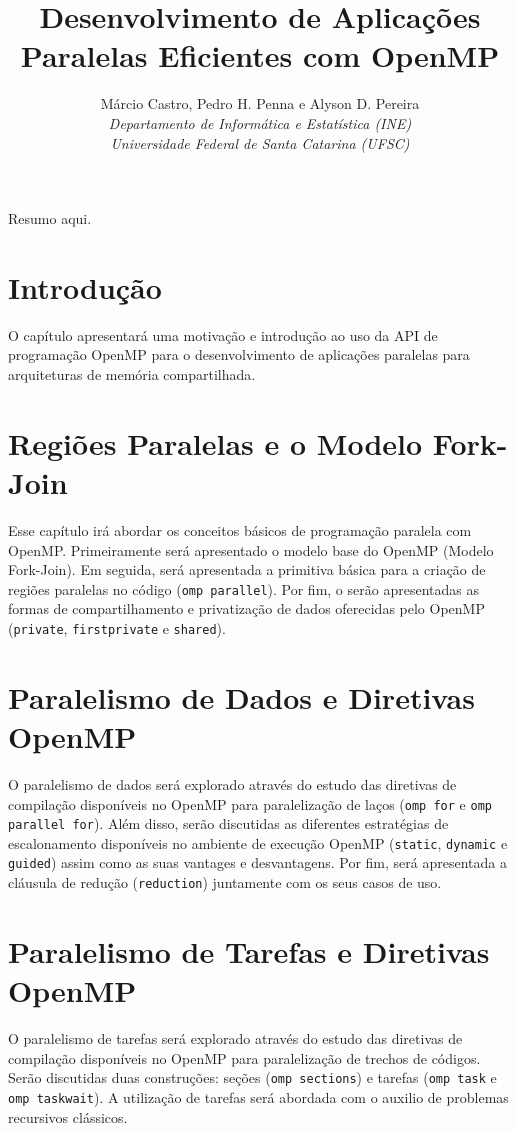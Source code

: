 \documentclass{SBCbookchapter}
\author{Márcio Castro, Pedro H. Penna e Alyson D. Pereira\\
\textit{Departamento de Informática e Estatística (INE)}\\
\textit{Universidade Federal de Santa Catarina (UFSC)}
}
\title{Desenvolvimento de Aplicações Paralelas Eficientes com OpenMP}
\begin{document}
\maketitle

\begin{resumo}
Resumo aqui.
\end{resumo}

\section{Introdução}

O capítulo apresentará uma motivação e introdução ao uso da API de programação OpenMP para o desenvolvimento de aplicações paralelas para arquiteturas de memória compartilhada.

\section{Regiões Paralelas e o Modelo Fork-Join}

Esse capítulo irá abordar os conceitos básicos de programação paralela com OpenMP. Primeiramente será apresentado o modelo base do OpenMP (Modelo Fork-Join). Em seguida, será apresentada a primitiva básica para a criação de regiões paralelas no código (\texttt{omp parallel}). Por fim, o serão apresentadas as formas de compartilhamento e privatização de dados oferecidas pelo OpenMP (\texttt{private}, \texttt{firstprivate} e \texttt{shared}).

\section{Paralelismo de Dados e Diretivas OpenMP}

O paralelismo de dados será explorado através do estudo das diretivas de compilação disponíveis no OpenMP para paralelização de laços (\texttt{omp for} e \texttt{omp parallel for}). Além disso, serão discutidas as diferentes estratégias de escalonamento disponíveis no ambiente de execução OpenMP (\texttt{static}, \texttt{dynamic} e \texttt{guided}) assim como as suas vantages e desvantagens. Por fim, será apresentada a cláusula de redução (\texttt{reduction}) juntamente com os seus casos de uso.

\section{Paralelismo de Tarefas e Diretivas OpenMP}

O paralelismo de tarefas será explorado através do estudo das diretivas de compilação disponíveis no OpenMP para paralelização de trechos de códigos. Serão discutidas duas construções: seções (\texttt{omp sections}) e tarefas (\texttt{omp task} e \texttt{omp taskwait}). A utilização de tarefas será abordada com o auxilio de problemas recursivos clássicos.
\end{document}
